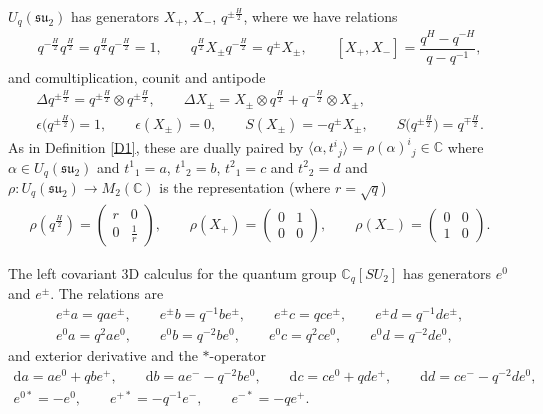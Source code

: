 \documentclass[10pt,a4paper]{amsart}
\numberwithin{equation}{section}
\newcommand{\extd}{\mathrm{d}}
\newcommand{\tens}{\mathop{\otimes}}
\newcommand{\C}{\mathbb{C}}
\newcommand{\<}{\langle}
\renewcommand{\>}{\rangle}
\begin{document}
\begin{Definition}
	$ U_{q}({\mathfrak{su}}_{2}) $ has generators $ X_{+}$, $X_{-}$, $q^{\pm \frac{H}{2}}$, where we have relations
	\begin{gather*}
	q^{-\frac{H}{2}} q^{\frac{H}{2}} = q^{\frac{H}{2}} q^{-\frac{H}{2}}=1, \qquad q^{\frac{H}{2}} X_{\pm} q^{-\frac{H}{2}}=q^{\pm} X_{\pm}, \qquad [X_{+}, X_{-}]= \dfrac{q^{H}- q^{-H}}{q-q^{-1}},
	\end{gather*}
	and comultiplication, counit and antipode
\begin{gather*}
		\Delta q^{\pm \frac{H}{2}}= q^{\pm \frac{H}{2}} \tens q^{\pm \frac{H}{2}}, \qquad \Delta X_{\pm} = X_{\pm} \tens q^{ \frac{H}{2}}+q^{-\frac{H}{2}} \tens X_{\pm},\\ \epsilon \big(q^{\pm \frac{H}{2}} \big)=1, \qquad \epsilon (X_{\pm})=0,\qquad
	S(X_{\pm})=-q^{\pm} X_{\pm}, \qquad S \big( q^{\pm \frac{H}{2}}\big)= q^{\mp \frac{H}{2}}.
\end{gather*}
As in Definition \ref{D1}, these are dually paired by $ 	\langle \alpha, t^{i} {}_{j}\rangle= \rho (\alpha)^{i} {}_{j} \in \C$ where $ \alpha \in U_{q}({\mathfrak{su}}_{2}) $ and $ t^{1}{}_{1}=a$, $t^{1}{}_{2}= b$, $t^{2}{}_{1}=c$ and $ t^{2}{}_{2}=d $ and $ \rho\colon U_{q}({\mathfrak{su}}_{2}) \rightarrow M_{2}(\C) $ is the representation (where $ r=\sqrt{q}$)
	\begin{gather*}
	\rho(q^{\frac{H}{2}} )=\left( \begin{matrix}
		r& 0\\
		0& \frac{1}{r}
	\end{matrix} \right), \qquad \rho (X_{+})= \left( \begin{matrix}
		0& 1 \\
		0& 0
	\end{matrix} \right), \qquad \rho (X_{-})= \left( \begin{matrix}
		0& 0\\
		1& 0
	\end{matrix} \right).
\end{gather*}
\end{Definition}
\begin{Definition} The left covariant $ 3 $D calculus for the quantum group $ \C_{q}[SU_{2}] $ has generators $ e^{0} $ and $ e^{\pm} $. The relations are
\begin{gather*}
	e^{\pm} a = q a e^{\pm},\qquad e^{\pm} b = q^{-1} b e^{\pm},\qquad e^{\pm} c = q c e^{\pm},\qquad e^{\pm} d = q^{-1} d e^{\pm},\\
	e^{0} a = q^{2} a e^{0},\qquad e^{0} b = q^{-2} b e^{0},\qquad e^{0} c = q^{2} c e^{0},\qquad e^{0} d = q^{-2} d e^{0},
\end{gather*}
and exterior derivative and the $*$-operator
\begin{gather*}
	\extd a = a e^{0}+q b e^{+},\qquad \extd b = a e^{-}-q^{-2} b e^{0}, \qquad 	\extd c =c e^{0}+ q d e^{+},\qquad \extd d = c e^{-}-q^{-2} d e^{0}, \\	e^{0*}= - e^{0}, \qquad e^{+*}= -q^{-1} e^{-}, \qquad e^{-*}= -q e^{+}.
\end{gather*}
\end{Definition}
\end{document}
